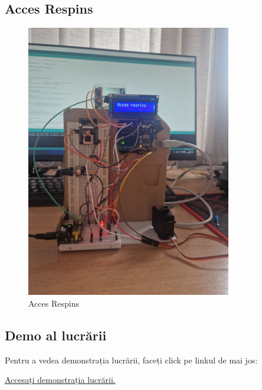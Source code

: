\documentclass{report}
\begin{document}
\subsection{Acces Respins}

\begin{figure}[H]
    \centering
    \includegraphics[width=0.8\textwidth]{acces_respins.jpg}
    \caption{Acces Respins}
    \label{acces_respins}
\end{figure} 

\subsection{Demo al lucrării}
Pentru a vedea demonstrația lucrării, faceți click pe linkul de mai jos:

\href{https://drive.google.com/file/d/1o6D4ZIHbieUeYSbBxNVs0JoG-Dac_61w/view?usp=sharing}{Accesați demonstrația lucrării.}
\end{document}
